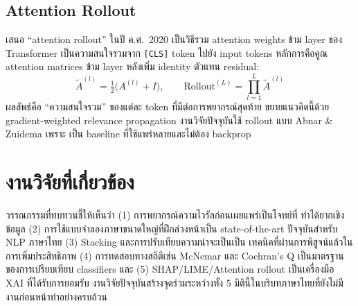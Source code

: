 \subsection{Attention Rollout}

\textbf{\textcite{abnar2020quantifying}} เสนอ ``attention
rollout'' ในปี ค.ศ.\ 2020 เป็นวิธีรวม attention weights ข้าม layer ของ
Transformer เป็นความสนใจรวมจาก \texttt{[CLS]} token ไปยัง input tokens
หลักการคือคูณ attention matrices ข้าม layer หลังเพิ่ม identity ตัวแทน
residual:
\begin{equation}
\tilde A^{(l)} = \tfrac{1}{2}\bigl(A^{(l)} + I\bigr),
\qquad
\mathrm{Rollout}^{(L)} = \prod_{l=1}^{L} \tilde A^{(l)}
\label{eq:attnroll}
\end{equation}
ผลลัพธ์คือ ``ความสนใจรวม'' ของแต่ละ token ที่มีต่อการพยากรณ์สุดท้าย
\textcite{chefer2021transformer} ขยายแนวคิดนี้ด้วย gradient-weighted
relevance propagation งานวิจัยปัจจุบันใช้ rollout แบบ Abnar \& Zuidema เพราะ
เป็น baseline ที่ใช้แพร่หลายและไม่ต้อง backprop

\section{งานวิจัยที่เกี่ยวข้อง}
\label{sec:lit-summary}

วรรณกรรมที่ทบทวนชี้ให้เห็นว่า (1) การพยากรณ์ความไวรัลก่อนเผยแพร่เป็นโจทย์ที่
ทำได้ยากเชิงข้อมูล (2) การใช้แบบจำลองภาษาขนาดใหญ่ที่ฝึกล่วงหน้าเป็น state-of-the-art
ปัจจุบันสำหรับ NLP ภาษาไทย (3) Stacking และการปรับเทียบความน่าจะเป็นเป็น
เทคนิคที่ผ่านการพิสูจน์แล้วในการเพิ่มประสิทธิภาพ (4) การทดสอบทางสถิติเช่น
McNemar และ Cochran's Q เป็นมาตรฐานของการเปรียบเทียบ classifiers และ (5)
SHAP/LIME/Attention rollout เป็นเครื่องมือ XAI ที่ได้รับการยอมรับ
งานวิจัยปัจจุบันสร้างจุดร่วมระหว่างทั้ง 5 มิตินี้ในบริบทภาษาไทยที่ยังไม่มี
งานก่อนหน้าทำอย่างครบถ้วน
